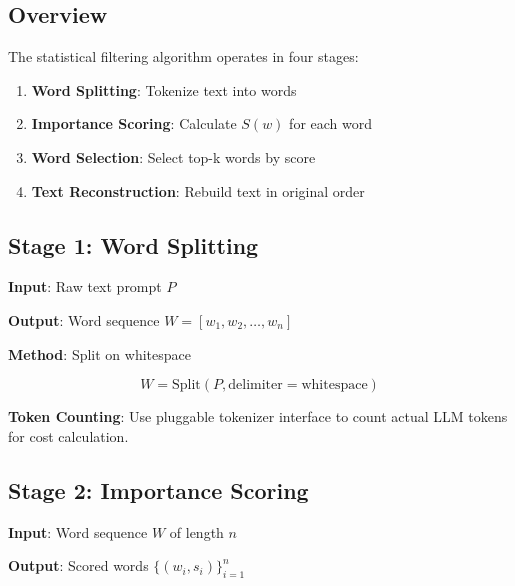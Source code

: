 \label{sec:algorithm}

\subsection{Overview}

The statistical filtering algorithm operates in four stages:

\begin{enumerate}
    \item \textbf{Word Splitting}: Tokenize text into words
    \item \textbf{Importance Scoring}: Calculate $S(w)$ for each word
    \item \textbf{Word Selection}: Select top-k words by score
    \item \textbf{Text Reconstruction}: Rebuild text in original order
\end{enumerate}

\subsection{Stage 1: Word Splitting}

\textbf{Input}: Raw text prompt $P$

\textbf{Output}: Word sequence $W = [w_1, w_2, \ldots, w_n]$

\textbf{Method}: Split on whitespace

\begin{equation}
W = \text{Split}(P, \text{delimiter}=\text{whitespace})
\end{equation}

\textbf{Token Counting}: Use pluggable tokenizer interface to count actual LLM tokens for cost calculation.

\subsection{Stage 2: Importance Scoring}

\textbf{Input}: Word sequence $W$ of length $n$

\textbf{Output}: Scored words $\{(w_i, s_i)\}_{i=1}^{n}$


